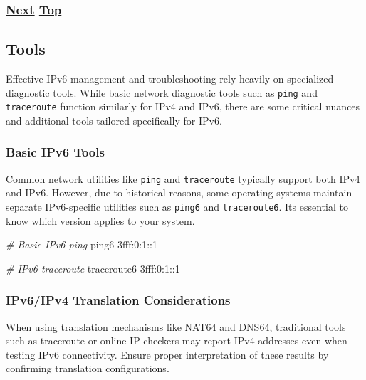 \documentclass[
]{article}
\newenvironment{Shaded}{}{}
\newcommand{\CommentTok}[1]{\textcolor[rgb]{0.38,0.63,0.69}{\textit{#1}}}
\newcommand{\ExtensionTok}[1]{#1}
\newcommand{\NormalTok}[1]{#1}
\begin{document}
\subsubsection{\texorpdfstring{\hyperref[tools]{Next}
\hyperref[troubleshooting]{Top}}{Next Top}}\label{next-top-8}

\pagebreak

\subsection{Tools}\label{tools}

Effective IPv6 management and troubleshooting rely heavily on
specialized diagnostic tools. While basic network diagnostic tools such
as \texttt{ping} and \texttt{traceroute} function similarly for IPv4 and
IPv6, there are some critical nuances and additional tools tailored
specifically for IPv6.

\subsubsection{Basic IPv6 Tools}\label{basic-ipv6-tools}

Common network utilities like \texttt{ping} and \texttt{traceroute}
typically support both IPv4 and IPv6. However, due to historical
reasons, some operating systems maintain separate IPv6-specific
utilities such as \texttt{ping6} and \texttt{traceroute6}.
It\textquotesingle s essential to know which version applies to your
system.

\begin{Shaded}
\begin{Highlighting}[]
\CommentTok{\# Basic IPv6 ping}
\ExtensionTok{ping6}\NormalTok{ 3fff:0:1::1}

\CommentTok{\# IPv6 traceroute}
\ExtensionTok{traceroute6}\NormalTok{ 3fff:0:1::1}
\end{Highlighting}
\end{Shaded}

\subsubsection{IPv6/IPv4 Translation
Considerations}\label{ipv6ipv4-translation-considerations}

When using translation mechanisms like NAT64 and DNS64, traditional
tools such as traceroute or online IP checkers may report IPv4 addresses
even when testing IPv6 connectivity. Ensure proper interpretation of
these results by confirming translation configurations.
\end{document}
